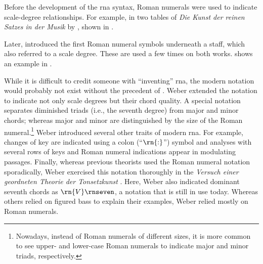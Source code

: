



Before the development of the \gls{rna} syntax, Roman
numerals were used to indicate scale-degree relationships.
For example, in two tables of \emph{Die Kunst der reinen
Satzes in der Musik} by \textcite{kirnberger1774kunst},
shown in .


Later, \textcite{vogler1778grunde, vogler1802handbuch}
introduced the first Roman numeral symbols underneath a
staff, which also referred to a scale degree. These are used
a few times on both works.
 shows an
example in \textcite{vogler1778grunde}.


While it is difficult to credit someone with ``inventing''
\gls{rna}, the modern notation would probably
not exist without the precedent of
\textcite{weber1817versuch}. Weber extended the notation to
indicate not only scale degrees but their chord quality. A
special notation separates diminished triads (i.e., the
seventh degree) from major and minor chords; whereas major
and minor are distinguished by the size of the Roman
numeral.\footnote{Nowadays, instead of Roman numerals of
different sizes, it is more common to see upper- and
lower-case Roman numerals to indicate major and minor
triads, respectively.} Weber introduced several other traits
of modern \gls{rna}. For example, changes of key are
indicated using a colon (``$\rn{:}$'') symbol and analyses
with several rows of keys and Roman numeral indications
appear in modulating passages. Finally, whereas previous
theorists used the Roman numeral notation sporadically,
Weber exercised this notation thoroughly in the
\emph{Versuch einer geordneten Theorie der Tonsetzkunst}
\parencite{weber1817versuch}. Here, Weber also indicated
dominant seventh chords as $\rn{V}\rnseven$, a notation that
is still in use today. Whereas others relied on figured bass
to explain their examples, Weber relied mostly on Roman
numerals.
